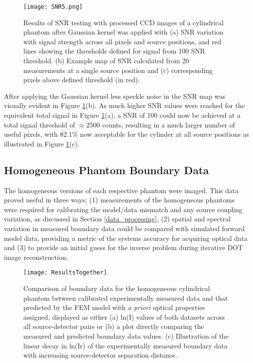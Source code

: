 \documentclass[twoside]{bhamthesis}
\theoremstyle{definition}
\begin{document}
\begin{figure}[!ht]
\centering\texttt{[image: SNR5.png]}
\caption{Results of SNR testing with processed CCD images of a cylindrical phantom after Gaussian kernel was applied with (a) SNR variation with signal strength across all pixels and source positions, and red lines showing the thresholds defined for signal from 100 SNR threshold. (b) Example map of SNR calculated from 20 measurements at a single source position and (c) corresponding pixels above defined threshold (in red).}
\label{fig:SNR5}
\end{figure}

After applying the Gaussian kernel less speckle noise in the SNR map was visually evident in Figure \ref{fig:SNR5}(b). As much higher SNR values were reached for the equivalent total signal in Figure \ref{fig:SNR5}(a), a SNR of 100 could now be achieved at a total signal threshold of $\approx$2500 counts, resulting in a much larger number of useful pixels, with 82.1\% now acceptable for the cylinder at all source positions as illustrated in Figure \ref{fig:SNR5}(c). 
  


\subsection{Homogeneous Phantom Boundary Data}
\label{Homogeneous Phantom Boundary Data}

The homogeneous versions of each respective phantom were imaged. This data proved useful in three ways; (1) measurements of the homogeneous phantoms were required for calibrating the model/data mismatch and any source coupling variation, as discussed in Section \ref{data_processing}, (2) spatial and spectral variation in measured boundary data could be compared with simulated forward model data, providing a metric of the systems accuracy for acquiring optical data and (3) to provide an initial guess for the inverse problem during iterative DOT image reconstruction.


\begin{figure}[!ht]
\centering
  \texttt{[image: ResultsTogether]}
  \caption{Comparison of boundary data for the homogeneous cylindrical phantom between calibrated experimentally measured data and that predicted by the FEM model with \textit{a priori} optical properties assigned, displayed as either (a) ln(I) values of both datasets across all source-detector pairs or (b) a plot directly comparing the measured and predicted boundary data values. (c) Illustration of the linear decay in ln(Ir) of the experimentally measured boundary data with increasing source-detector separation distance.}
    \label{fig:ResultsTogether}
\end{figure}
\end{document}
